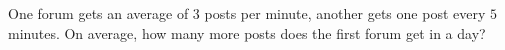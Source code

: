 One forum gets an average of $3$ posts per minute, another gets one post every $5$ minutes. On average, how many more posts does the first forum get in a day?

